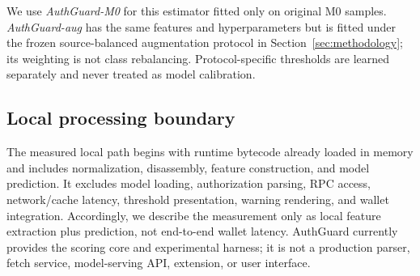 We use \emph{AuthGuard-M0} for this estimator fitted only on original M0 samples. \emph{AuthGuard-aug} has the same features and hyperparameters but is fitted under the frozen source-balanced augmentation protocol in Section~\ref{sec:methodology}; its weighting is not class rebalancing. Protocol-specific thresholds are learned separately and never treated as model calibration.

\subsection{Local processing boundary}

The measured local path begins with runtime bytecode already loaded in memory and includes normalization, disassembly, feature construction, and model prediction. It excludes model loading, authorization parsing, RPC access, network/cache latency, threshold presentation, warning rendering, and wallet integration. Accordingly, we describe the measurement only as local feature extraction plus prediction, not end-to-end wallet latency. AuthGuard currently provides the scoring core and experimental harness; it is not a production parser, fetch service, model-serving API, extension, or user interface.
